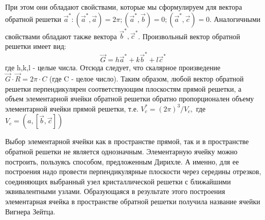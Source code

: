 При этом они обладают свойствами, которые мы сформулируем для вектора обратной решетки $\vec{a}^{*} :\left(\vec{a}^{*},
\vec{a}\right)=2 \pi; \left(\vec{a}^{*}, \vec{b}\right)=0 ;\left(\vec{a}^{*}, \vec{c}\right)=0$. Аналогичными свойствами
обладают также вектора $\vec{b}^{*},\vec{c}^{*}$.
Произвольный вектор обратной решетки имеет вид:
\begin{equation}
	\vec{G}=h \vec{a}^{*}+k \vec{b}^{*}+l \vec{c}^{*}
	\label{eq:1.3}
\end{equation}
где h,k,l - целые числа. Отсюда следует, что скалярное произведение $\vec{G} \cdot \vec{R}=2 \pi \cdot C$ (где C - целое
число). Таким образом, любой вектор обратной решетки перпендикулярен соответствующим плоскостям прямой решетки, а объем
элементарной ячейки обратной решетки обратно пропорционален объему элементарной ячейки прямой решетки, т.е. $V_{c}^{*}=(2 \pi)^{3}/V_{c},$ где $V_{c}=(a,[\vec{b}, \vec{c}])$

Выбор элементарной ячейки как в пространстве прямой, так и в пространстве обратной решетки не является однозначным.
Элементарную ячейку можно построить, пользуясь способом, предложенным Дирихле. А именно, для ее построения надо провести
перпендикулярные плоскости через середины отрезков, соединяющих выбранный узел кристаллической решетки с ближайшими
эквивалентными узлами. Образующаяся в результате этого построения элементарная ячейка в пространстве обратной решетки
получила название ячейки Вигнера Зейтца.

